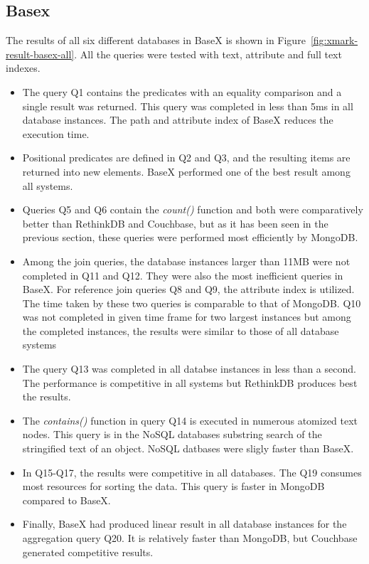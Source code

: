 \subsection{Basex}
The results of all six different databases in BaseX is shown in Figure~\ref{fig:xmark-result-basex-all}. All the queries were tested with text, attribute and full text indexes. 
\begin{itemize}
\item The query Q1 contains the predicates with an equality comparison and a single result was returned. This query was completed in less than 5ms in all database instances.  The path and attribute index of BaseX reduces the execution time.

\item Positional predicates are defined in Q2 and Q3, and the resulting items are returned into new elements. BaseX performed one of the best result among all systems. 

\item Queries Q5 and Q6 contain the \textit{count()} function and both were comparatively better than RethinkDB and Couchbase, but as it has been seen in the previous section, these queries were performed most efficiently by MongoDB.
\item 
Among the join queries, the database instances larger than 11MB were not completed in Q11 and Q12. They were also the most inefficient queries in BaseX.  For reference join queries Q8 and Q9, the attribute index is utilized. The time taken by these two queries is comparable to that of MongoDB. Q10 was not completed in given time frame for two largest instances but among the completed instances, the results were similar to those of all database systems 
\item The query Q13 was completed in all databse instances in less than a second. The performance is competitive in all systems but RethinkDB produces best the results. 
\item  The \textit{contains()} function in query Q14 is executed in numerous atomized text nodes. This query is in the NoSQL databases substring search of the stringified text of an object. NoSQL datbases were sligly faster than BaseX. 

\item In Q15-Q17, the results were competitive in all databases. The Q19 consumes most resources for sorting the data. This query is faster in MongoDB compared to BaseX.

\item Finally, BaseX  had produced linear result in all database instances for the aggregation query Q20. It is relatively faster than MongoDB, but Couchbase generated competitive results. 
\end{itemize}
